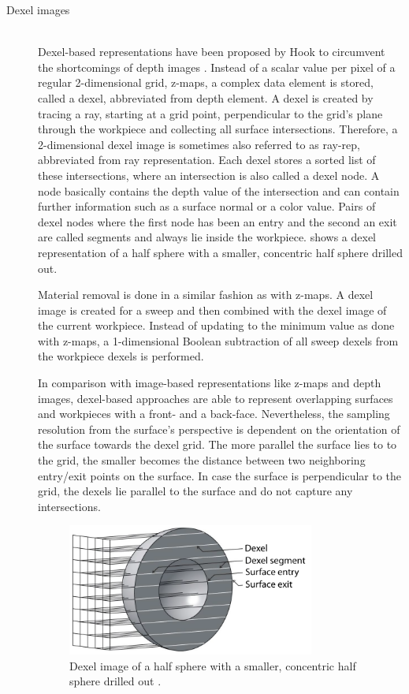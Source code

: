 \begin{description}
	\item[Dexel images] \hfill \\
	Dexel-based representations have been proposed by Hook to circumvent the shortcomings of depth images \cite{dexel}.
	Instead of a scalar value per pixel of a regular 2-dimensional grid, z-maps, a complex data element is stored, called a dexel, abbreviated from depth element.
	A dexel is created by tracing a ray, starting at a grid point, perpendicular to the grid's plane through the workpiece and collecting all surface intersections.
	Therefore, a 2-dimensional dexel image is sometimes also referred to as ray-rep, abbreviated from ray representation.
	Each dexel stores a sorted list of these intersections, where an intersection is also called a dexel node.
	A node basically contains the depth value of the intersection and can contain further information such as a surface normal or a color value.
	Pairs of dexel nodes where the first node has been an entry and the second an exit are called segments and always lie inside the workpiece.
	 shows a dexel representation of a half sphere with a smaller, concentric half sphere drilled out.

	Material removal is done in a similar fashion as with z-maps.
	A dexel image is created for a sweep and then combined with the dexel image of the current workpiece.
	Instead of updating to the minimum value as done with z-maps, a 1-dimensional Boolean subtraction of all sweep dexels from the workpiece dexels is performed.

	In comparison with image-based representations like z-maps and depth images, dexel-based approaches are able to represent overlapping surfaces and workpieces with a front- and a back-face.
	Nevertheless, the sampling resolution from the surface's perspective is dependent on the orientation of the surface towards the dexel grid.
	The more parallel the surface lies to to the grid, the smaller becomes the distance between two neighboring entry/exit points on the surface.
	In case the surface is perpendicular to the grid, the dexels lie parallel to the surface and do not capture any intersections.

	\begin{figure}[H]
		\centering
		\includegraphics[width=0.8\textwidth]{images/dexels}
		\caption[Dexel image]{
			Dexel image of a half sphere with a smaller, concentric half sphere drilled out \cite{virtual_machining_review}.
		}
		\label{fig:dexel_image}
	\end{figure}



\end{description}
